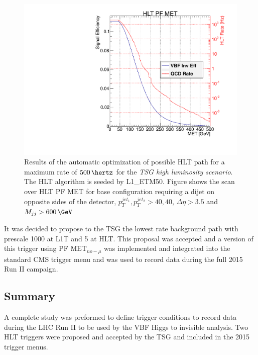 \begin{figure}[!htp]%
\centering
\includegraphics[width=0.55\linewidth]{Chapter08/TriggerStudies/HLT/Systematics/L1ETM50_HLT_DijetVBF40_DEta3p5_MJJ600.pdf}
\caption{Results of the automatic optimization of possible \gls{HLT} path for a maximum rate of $500\,\hertz$ for the \textit{\gls{TSG} high luminosity scenario}. The \gls{HLT} algorithm is seeded by L1\_ETM50. Figure shows the scan over \gls{HLT} \gls{PF} \gls{MET} for base configuration requiring a dijet on opposite sides of the detector, $p_T^{jet_1},p_T^{jet_2}>40,40$, $\Delta\eta>3.5$ and $M_{jj}>600\,\GeV$}
\label{FIGURE:RunIITriggerStudies_SystematicsPath}
\end{figure}

It was decided to propose to the \gls{TSG} the lowest rate background path with prescale 1000 at \gls{L1T} and 5 at \gls{HLT}. This proposal was accepted and a version of this trigger using \gls{PF} $\text{MET}_{no-\mu}$ was implemented and integrated into the standard \gls{CMS} trigger menu and was used to record data during the full 2015 Run II campaign.

\subsection{Summary}
\label{SUBSECTION:RunIIPreparation_Summary}


A complete study was preformed to define trigger conditions to record data during the \gls{LHC} Run II to be used by the \gls{VBF} Higgs to invisible analysis. Two \gls{HLT} triggers were proposed and accepted by the \gls{TSG} and included in the 2015 trigger menus. 

